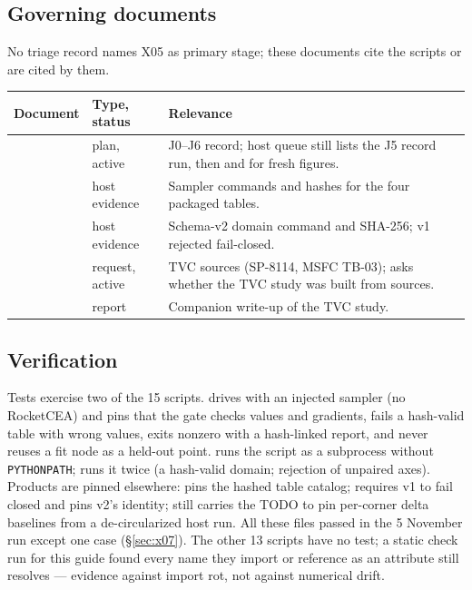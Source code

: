 \subsection{Governing documents}
No triage record names X05 as primary stage; these documents cite the scripts or are cited by them.

{\chelevenTables
\begin{longtable}{P{6.3cm}P{2.2cm}P{7.3cm}}
\toprule
Document & Type, status & Relevance \\
\midrule\endhead
{} & plan, active & J0--J6 record; host queue still lists the J5 record run, then  and  for fresh figures. \\
 & host evidence & Sampler commands and hashes for the four packaged tables. \\
 & host evidence & Schema-v2 domain command and SHA-256; v1 rejected fail-closed. \\
 & request, active & TVC sources (SP-8114, MSFC TB-03); asks whether the TVC study was built from sources. \\
 & report & Companion write-up of the TVC study. \\
\bottomrule
\end{longtable}}

\subsection{Verification}
Tests exercise two of the 15 scripts.  drives  with an injected sampler (no RocketCEA) and pins that the gate checks values and gradients, fails a hash-valid table with wrong values, exits nonzero with a hash-linked report, and never reuses a fit node as a held-out point.  runs the script as a subprocess without \texttt{PYTHONPATH};  runs it twice (a hash-valid domain; rejection of unpaired axes). Products are pinned elsewhere:  pins the hashed table catalog;  requires v1 to fail closed and pins v2's identity;  still carries the TODO to pin per-corner delta baselines from a de-circularized  host run. All these files passed in the 5 November run except one  case (\S\ref{sec:x07}). The other 13 scripts have no test; a static check run for this guide found every  name they import or reference as an attribute still resolves --- evidence against import rot, not against numerical drift.

